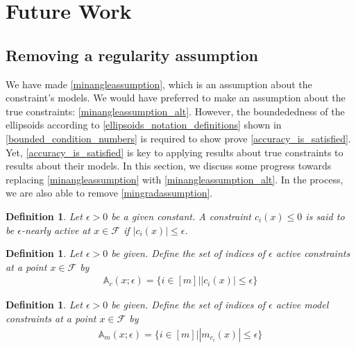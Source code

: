 \documentclass{article}
\newtheorem{definition}[theorem]{Definition}
\theoremstyle{case}
\numberwithin{theorem}{subsection}
\newcommand{\feasible}{{\mathcal F}}
\newcommand{\epsactive}{{\mathbb A_c}}
\newcommand{\epsactivemodels}{{\mathbb A_{m}}}
\begin{document}
\section{Future Work}
\subsection{Removing a regularity assumption}
\label{alternative_assumptions_section}

We have made \cref{minangleassumption}, which is an assumption about the constraint's models.
We would have preferred to make an assumption about the true constraints: \cref{minangleassumption_alt}.
However, the boundededness of the ellipsoids according to \cref{ellipsoids_notation_definitions} shown in \cref{bounded_condition_numbers}
is required to show prove \cref{accuracy_is_satisfied}.
Yet, \cref{accuracy_is_satisfied} is key to applying results about true constraints to results about their models.
In this section, we discuss some progress towards replacing \cref{minangleassumption} with \cref{minangleassumption_alt}.
In the process, we are also able to remove \cref{mingradassumption}.






\begin{definition}
Let $\epsilon > 0$ be a given constant.
A constraint $c_i(x) \le 0$ is said to be $\epsilon$-nearly active at $x \in \feasible$ if $|c_i(x)| \le \epsilon$.
\end{definition}

\begin{definition}
Let $\epsilon > 0$ be given.
Define the set of indices of $\epsilon$ active constraints at a point $x \in \feasible$ by
\begin{align}
\epsactive(x; \epsilon) = \bigg\{ i \in [m] \bigg | |c_i(x)| \le \epsilon \bigg\} \label{define_epsactive}
\end{align}
\end{definition}

\begin{definition}
Let $\epsilon > 0$ be given.
Define the set of indices of $\epsilon$ active model constraints at a point $x \in \feasible$ by
\begin{align}
\epsactivemodels(x; \epsilon) = \bigg\{ i \in [m] \bigg | |m_{c_i}(x)| \le \epsilon  \bigg\} \label{define_epsactivemodels}
\end{align}
\end{definition}
\end{document}
